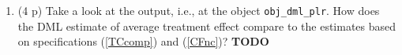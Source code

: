 \documentclass[
]{article}
\providecommand{\tightlist}{%
  \setlength{\itemsep}{0pt}\setlength{\parskip}{0pt}}
\begin{document}
\begin{enumerate}
  \begin{enumerate}
  \def\labelenumii{\roman{enumii}.}
  \tightlist
  \item
    (4 p) Take a look at the output, i.e., at the object
    \texttt{obj\_dml\_plr}. How does the DML estimate of average
    treatment effect compare to the estimates based on specifications
    (\ref{TCcomp}) and (\ref{CFnc})? \textbf{TODO}
  \end{enumerate}
\end{enumerate}
\end{document}
